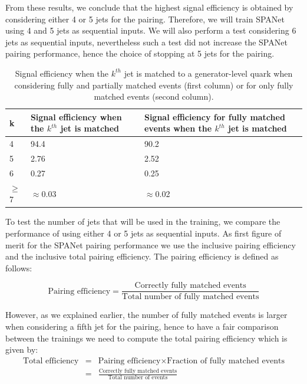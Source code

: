 From these results, we conclude that the highest signal efficiency is obtained by considering either 4 or 5 jets for the pairing. Therefore, we will train SPANet using 4 and 5 jets as sequential inputs. We will also perform a test considering 6 jets as sequential inputs, nevertheless such a test did not increase the SPANet pairing performance, hence the choice of stopping at 5 jets for the pairing.


\begin{table}[h!]
\centering
\begin{tabular}{|p{1cm}||p{6cm}||p{6cm}|}
 \hline
 k& Signal efficiency when the $k^{th}$ jet is matched& Signal efficiency for fully matched events when the $k^{th}$ jet is matched\\
 \hline
 4 &  94.4 & 90.2\\
 5 & 2.76 & 2.52 \\
 6 & 0.27 & 0.25 \\
 $\geq$7 &  $\approx$0.03 &  $\approx$0.02 \\
 \hline
\end{tabular}
\caption{Signal efficiency when the $k^{th}$ jet is matched to a generator-level quark when considering fully and partially matched events (first column) or for only fully matched events (second column). }
\label{table:signal_efficiency}
\end{table}

To test the number of jets that will be used in the training, we compare the performance of using either 4 or 5 jets as sequential inputs. As first figure of merit for the SPANet pairing performance we use the inclusive pairing efficiency and the inclusive total pairing efficiency. The pairing efficiency is defined as follows:

\begin{equation*}
    \text{Pairing efficiency}=\frac{\text{Correctly fully matched events}}{\text{Total number of fully matched events}}
\end{equation*}

However, as we explained earlier, the number of fully matched events is larger when considering a fifth jet for the pairing, hence to have a fair comparison between the trainings we need to compute the total pairing efficiency which is given by:
\vspace{-0.2cm}
\begin{eqnarray*}
\text{Total efficiency} & = & \text{Pairing efficiency} \times \text{Fraction of fully matched events} \\
& = &\frac{\text{Correctly fully matched events}}{\text{Total number of events}}     
\end{eqnarray*}

